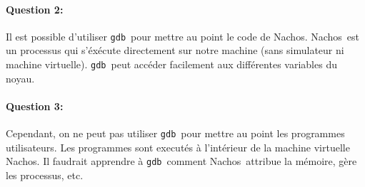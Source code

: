 \documentclass[11pt]{article}
\def\question#1{\paragraph{Question #1:}}
\def\gdb{\texttt{gdb}}
\def\nachos{Nachos}
\begin{document}
\question{2} Il est possible d'utiliser \gdb\ pour mettre au point le code de \nachos. \nachos\ est un processus qui s'éxécute directement sur notre machine (sans simulateur ni machine virtuelle). \gdb\ peut accéder facilement aux différentes variables du noyau.

\question{3} Cependant, on ne peut pas utiliser \gdb\ pour mettre au point les programmes utilisateurs. Les programmes sont executés à l'intérieur de la machine virtuelle \nachos. Il faudrait apprendre à \gdb\ comment \nachos\ attribue la mémoire, gère les processus, etc.
\end{document}

